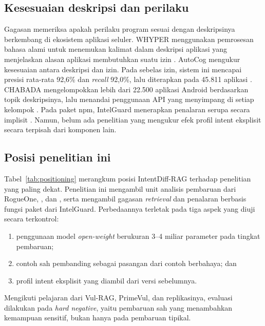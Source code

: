 \documentclass[a4paper,fleqn]{cas-dc}
\begin{document}
\subsection{Kesesuaian deskripsi dan perilaku}

Gagasan memeriksa apakah perilaku program sesuai dengan deskripsinya berkembang
di ekosistem aplikasi seluler. WHYPER menggunakan pemrosesan bahasa alami untuk
menemukan kalimat dalam deskripsi aplikasi yang menjelaskan alasan aplikasi
membutuhkan suatu izin \citep{pandita2013whyper}. AutoCog mengukur kesesuaian
antara deskripsi dan izin. Pada sebelas izin, sistem ini mencapai presisi
rata-rata 92,6\% dan \emph{recall} 92,0\%, lalu diterapkan pada 45.811 aplikasi
\citep{qu2014autocog}. CHABADA mengelompokkan lebih dari 22.500 aplikasi Android
berdasarkan topik deskripsinya, lalu menandai penggunaan API yang menyimpang di
setiap kelompok \citep{gorla2014checking}. Pada paket npm, IntelGuard menerapkan
penalaran serupa secara implisit \citep{guo2026bridging}. Namun, belum ada
penelitian yang mengukur efek profil intent eksplisit secara terpisah dari
komponen lain.

\subsection{Posisi penelitian ini}

Tabel~\ref{tab:positioning} merangkum posisi IntentDiff-RAG terhadap penelitian
yang paling dekat. Penelitian ini mengambil unit analisis pembaruan dari RogueOne,
\citet{froh2023differential}, dan \citet{wyss2025evaluating}, serta mengambil
gagasan \emph{retrieval} dan penalaran berbasis fungsi paket dari IntelGuard.
Perbedaannya terletak pada tiga aspek yang diuji secara terkontrol:
\begin{enumerate}
  \item penggunaan model \emph{open-weight} berukuran 3--4 miliar parameter pada
  tingkat pembaruan;
  \item contoh sah pembanding sebagai pasangan dari contoh berbahaya; dan
  \item profil intent eksplisit yang diambil dari versi sebelumnya.
\end{enumerate}
Mengikuti pelajaran dari Vul-RAG, PrimeVul, dan replikasinya, evaluasi dilakukan
pada \emph{hard negative}, yaitu pembaruan sah yang menambahkan kemampuan
sensitif, bukan hanya pada pembaruan tipikal.
\end{document}
